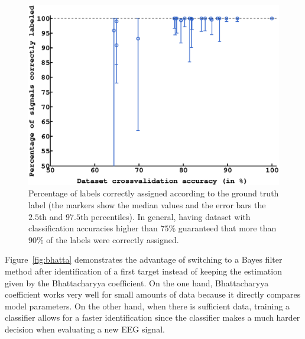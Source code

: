 \documentclass[letterpaper]{article}
\newcommand{\ww}{0.9}
\begin{document}
\begin{figure}[!ht]
    \centering
        \includegraphics[width=\ww\columnwidth]{img/plot_percent_label}
        \caption{Percentage of labels correctly assigned according to the ground truth label (the markers show the median values and the error bars the $2.5$th and $97.5$th percentiles). In general, having dataset with classification accuracies higher than $75\%$ guaranteed that more than $90\%$ of the labels were correctly assigned.}
        \label{fig:percentageLabels}
\end{figure}

Figure~\ref{fig:bhatta} demonstrates the advantage of switching to a Bayes filter method after identification of a first target instead of keeping the estimation given by the Bhattacharyya coefficient. On the one hand, Bhattacharyya coefficient works very well for small amounts of data because it directly compares model parameters. On the other hand, when there is sufficient data, training a classifier allows for a faster identification since the classifier makes a much harder decision when evaluating a new EEG signal.
\end{document}
